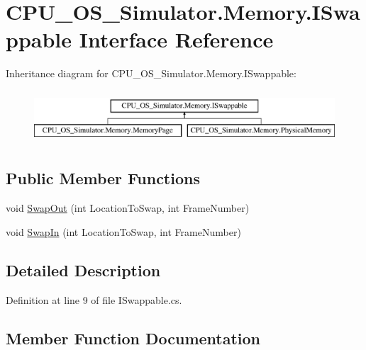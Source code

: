 \hypertarget{interface_c_p_u___o_s___simulator_1_1_memory_1_1_i_swappable}{}\section{C\+P\+U\+\_\+\+O\+S\+\_\+\+Simulator.\+Memory.\+I\+Swappable Interface Reference}
\label{interface_c_p_u___o_s___simulator_1_1_memory_1_1_i_swappable}
Inheritance diagram for C\+P\+U\+\_\+\+O\+S\+\_\+\+Simulator.\+Memory.\+I\+Swappable\+:\begin{figure}[H]
\begin{center}
\leavevmode
\includegraphics[height=2.000000cm]{interface_c_p_u___o_s___simulator_1_1_memory_1_1_i_swappable}
\end{center}
\end{figure}
\subsection*{Public Member Functions}
\begin{DoxyCompactItemize}
\item 
void \hyperlink{interface_c_p_u___o_s___simulator_1_1_memory_1_1_i_swappable_ae789e9deb0600d48b0dcbe4a4252220a}{Swap\+Out} (int Location\+To\+Swap, int Frame\+Number)
\item 
void \hyperlink{interface_c_p_u___o_s___simulator_1_1_memory_1_1_i_swappable_a38e30363486a3de53e6171da50b943af}{Swap\+In} (int Location\+To\+Swap, int Frame\+Number)
\end{DoxyCompactItemize}


\subsection{Detailed Description}


Definition at line 9 of file I\+Swappable.\+cs.



\subsection{Member Function Documentation}
\hypertarget{interface_c_p_u___o_s___simulator_1_1_memory_1_1_i_swappable_a38e30363486a3de53e6171da50b943af}{}
